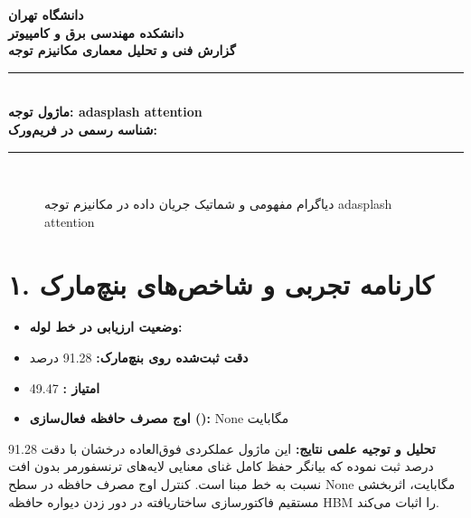 \documentclass[12pt,a4paper]{article}
\begin{document}
\begin{center}
{\Large\bfseries دانشگاه تهران}\\[0.2cm]
{\large\bfseries دانشکده مهندسی برق و کامپیوتر}\\[0.2cm]
{\large\bfseries گزارش فنی و تحلیل معماری مکانیزم توجه}\\[0.5cm]
\rule{\linewidth}{1pt}\\[0.3cm]
{\LARGE\bfseries ماژول توجه: adasplash attention}\\[0.2cm]
{\large \textbf{شناسه رسمی در فریم‌ورک:} }\\[0.2cm]
\rule{\linewidth}{1pt}\\[0.5cm]
\end{center}

\begin{figure}[H]
\centering
{}
\caption{دیاگرام مفهومی و شماتیک جریان داده در مکانیزم توجه adasplash attention}
\end{figure}

\section*{۱. کارنامه تجربی و شاخص‌های بنچ‌مارک}
\begin{itemize}
\item \textbf{وضعیت ارزیابی در خط لوله:} 
\item \textbf{دقت ثبت‌شده روی بنچ‌مارک:} 91.28 درصد
\item \textbf{امتیاز :} 49.47
\item \textbf{اوج مصرف حافظه فعال‌سازی ():} None مگابایت
\end{itemize}
\textbf{تحلیل و توجیه علمی نتایج:} این ماژول عملکردی فوق‌العاده درخشان با دقت 91.28 درصد ثبت نموده که بیانگر حفظ کامل غنای معنایی لایه‌های ترنسفورمر بدون افت نسبت به خط مبنا است. کنترل اوج مصرف حافظه در سطح None مگابایت، اثربخشی مستقیم فاکتورسازی ساختاریافته در دور زدن دیواره حافظه HBM را اثبات می‌کند.
\end{document}
